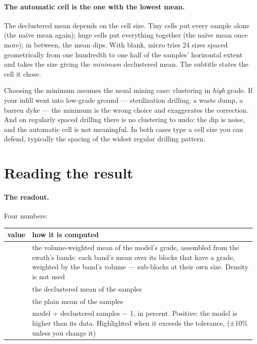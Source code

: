\paragraph{The automatic cell is the one with the lowest mean.} The declustered mean depends on the cell size. Tiny cells put every sample alone (the naïve mean again); huge cells put everything together (the naïve mean once more); in between, the mean dips. With  blank, micro tries 24 sizes spaced geometrically from one hundredth to one half of the samples' horizontal extent and takes the size giving the \emph{minimum} declustered mean. The subtitle states the cell it chose.

\begin{caution}
Choosing the minimum assumes the usual mining case: clustering in \emph{high} grade. If your infill went into low-grade ground — sterilization drilling, a waste dump, a barren dyke — the minimum is the wrong choice and exaggerates the correction. And on regularly spaced drilling there is no clustering to undo: the dip is noise, and the automatic cell is not meaningful. In both cases type a cell size you can defend, typically the spacing of the widest regular drilling pattern.
\end{caution}

\section{Reading the result}\label{sec:validation-reading}
\paragraph{The readout.} Four numbers:

\medskip
\begin{tabularx}{\linewidth}{@{}lL@{}}\toprule
value & how it is computed \\ \midrule
{} & the volume-weighted mean of the model's grade, assembled from the swath's bands: each band's mean over its blocks that have a grade, weighted by the band's volume — sub-blocks at their own size. Density is not used \\
 & the declustered mean of the samples \\
 & the plain mean of the samples \\
 & model ÷ declustered samples − 1, in percent. Positive: the model is higher than its data. Highlighted when it exceeds the tolerance,  (±10\% unless you change it) \\ \bottomrule
\end{tabularx}
\medskip

